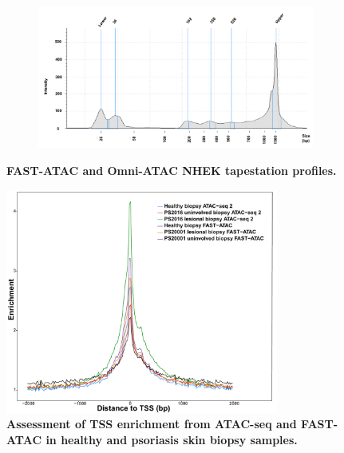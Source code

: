 \begin{figure}[htbp]
\begin{subfigure}{0.70\textwidth}
\caption{\textbf{}} %
\end{subfigure}
\begin{subfigure}{0.70\textwidth}
\centering
\includegraphics[width=\textwidth]{./Appendix/pdfs/Chapter3/Omni_ATAC_NHEK_Rep1_tapestation}
\caption{\textbf{}} %
\end{subfigure}
\hfill
\caption[FAST-ATAC and Omni-ATAC NHEK tapestation profiles.]{\textbf{FAST-ATAC and Omni-ATAC NHEK tapestation profiles.} \\
}
\label{fig:NHEK_tapestation}
\end{figure}



\begin{figure}[htbp]
\centering
\includegraphics[width=0.8\textwidth]{./Appendix/pdfs/Chapter3/ATAC_skin_biopsy_samples_all_methods_TSS_enrichment_supplementary}
\caption[Assessment of TSS enrichment from ATAC-seq and FAST-ATAC in healthy and psoriasis skin biopsies samples.]{\textbf{Assessment of TSS enrichment from ATAC-seq and FAST-ATAC in healthy and psoriasis skin biopsy samples.}  }
\label{fig:TSS_skin_biopsies}
\end{figure}



